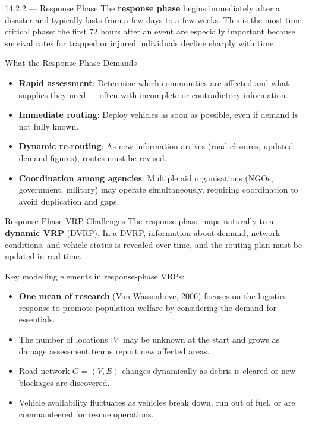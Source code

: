 \documentclass[aspectratio=169,10pt]{beamer}
\begin{document}
\begin{frame}[allowframebreaks]{14.2.2 --- Response Phase}
  The \textbf{response phase} begins immediately after a disaster and
  typically lasts from a few days to a few weeks.
  This is the most time-critical phase: the first 72 hours after an
  event are especially important because survival rates for trapped or
  injured individuals decline sharply with time.

  \medskip
  \begin{block}{What the Response Phase Demands}
    \begin{itemize}
      \item \textbf{Rapid assessment}: Determine which communities are
            affected and what supplies they need --- often with incomplete
            or contradictory information.
      \item \textbf{Immediate routing}: Deploy vehicles as soon as possible,
            even if demand is not fully known.
      \item \textbf{Dynamic re-routing}: As new information arrives (road
            closures, updated demand figures), routes must be revised.
      \item \textbf{Coordination among agencies}: Multiple aid
            organisations (NGOs, government, military) may operate
            simultaneously, requiring coordination to avoid duplication
            and gaps.
    \end{itemize}
  \end{block}

  \framebreak

  \begin{block}{Response Phase VRP Challenges}
    The response phase maps naturally to a \textbf{dynamic VRP} (DVRP).
    In a DVRP, information about demand, network conditions, and vehicle
    status is revealed over time, and the routing plan must be updated
    in real time.

    Key modelling elements in response-phase VRPs:
    \begin{itemize}
      \item \textbf{One mean of research} (Van Wassenhove, 2006) focuses
            on the logistics response to promote population welfare
            by considering the demand for essentials.
      \item The number of locations $|V|$ may be unknown at the start and
            grows as damage assessment teams report new affected areas.
      \item Road network $G = (V, E)$ changes dynamically as debris is
            cleared or new blockages are discovered.
      \item Vehicle availability fluctuates as vehicles break down,
            run out of fuel, or are commandeered for rescue operations.
    \end{itemize}
  \end{block}


\end{frame}
\end{document}
